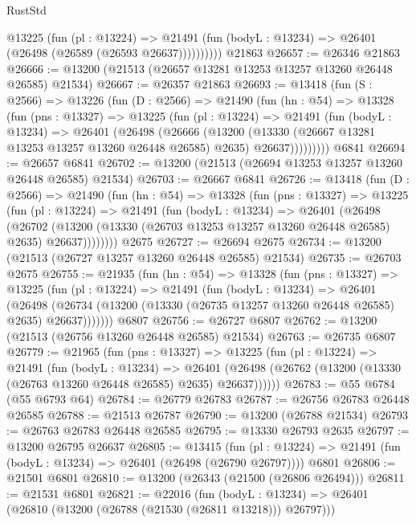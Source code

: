 \begin{lexlean}{RustStd}
\begin{coremodule}
            @13225
              (fun (pl : @13224) =>
              @21491 (fun (bodyL : @13234) => @26401 (@26498 (@26589 (@26593 @26637))))))))))
    @21863
@26657 := @26346 @21863
@26666 := @13200 (@21513 (@26657 @13281 @13253 @13257 @13260 @26448 @26585) @21534)
@26667 := @26357 @21863
@26693 := @13418
    (fun (S : @2566) =>
    @13226
      (fun (D : @2566) =>
      @21490
        (fun (hn : @54) =>
        @13328
          (fun (pns : @13327) =>
          @13225
            (fun (pl : @13224) =>
            @21491
              (fun (bodyL : @13234) =>
              @26401
                (@26498
                  (@26666
                    (@13200
                      (@13330 (@26667 @13281 @13253 @13257 @13260 @26448 @26585) @2635)
                      @26637)))))))))
    @6841
@26694 := @26657 @6841
@26702 := @13200 (@21513 (@26694 @13253 @13257 @13260 @26448 @26585) @21534)
@26703 := @26667 @6841
@26726 := @13418
    (fun (D : @2566) =>
    @21490
      (fun (hn : @54) =>
      @13328
        (fun (pns : @13327) =>
        @13225
          (fun (pl : @13224) =>
          @21491
            (fun (bodyL : @13234) =>
            @26401
              (@26498
                (@26702
                  (@13200 (@13330 (@26703 @13253 @13257 @13260 @26448 @26585) @2635) @26637))))))))
    @2675
@26727 := @26694 @2675
@26734 := @13200 (@21513 (@26727 @13257 @13260 @26448 @26585) @21534)
@26735 := @26703 @2675
@26755 := @21935
    (fun (hn : @54) =>
    @13328
      (fun (pns : @13327) =>
      @13225
        (fun (pl : @13224) =>
        @21491
          (fun (bodyL : @13234) =>
          @26401
            (@26498
              (@26734 (@13200 (@13330 (@26735 @13257 @13260 @26448 @26585) @2635) @26637)))))))
    @6807
@26756 := @26727 @6807
@26762 := @13200 (@21513 (@26756 @13260 @26448 @26585) @21534)
@26763 := @26735 @6807
@26779 := @21965
    (fun (pns : @13327) =>
    @13225
      (fun (pl : @13224) =>
      @21491
        (fun (bodyL : @13234) =>
        @26401 (@26498 (@26762 (@13200 (@13330 (@26763 @13260 @26448 @26585) @2635) @26637))))))
@26783 := @55 @6784 (@55 @6793 @64)
@26784 := @26779 @26783
@26787 := @26756 @26783 @26448 @26585
@26788 := @21513 @26787
@26790 := @13200 (@26788 @21534)
@26793 := @26763 @26783 @26448 @26585
@26795 := @13330 @26793 @2635
@26797 := @13200 @26795 @26637
@26805 := @13415
    (fun (pl : @13224) => @21491 (fun (bodyL : @13234) => @26401 (@26498 (@26790 @26797))))
    @6801
@26806 := @21501 @6801
@26810 := @13200 (@26343 (@21500 (@26806 @26494)))
@26811 := @21531 @6801
@26821 := @22016
    (fun (bodyL : @13234) => @26401 (@26810 (@13200 (@26788 (@21530 (@26811 @13218))) @26797)))

\end{coremodule}
\end{lexlean}
